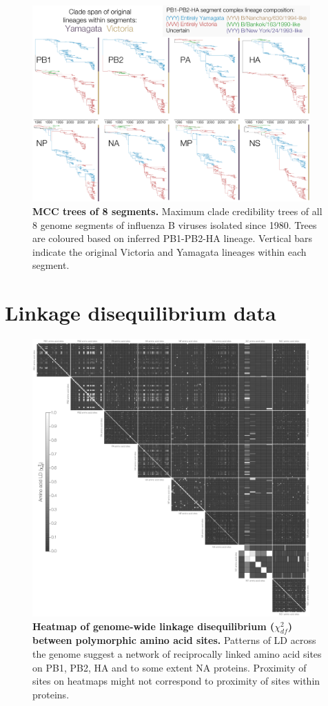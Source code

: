 \documentclass[11pt,oneside,letterpaper]{article}
\begin{document}
\begin{figure}
\centering  
\includegraphics[width=0.95\textwidth]  {supp_figures/InfB_genomeGrid.pdf}
\caption{\textbf{MCC trees of 8 segments.}
Maximum clade credibility trees of all 8 genome segments of influenza B viruses isolated since 1980.
Trees are coloured based on inferred PB1-PB2-HA lineage.
Vertical bars indicate the original Victoria and Yamagata lineages within each segment.}
\label{genomeGrid}
\end{figure}

\section*{Linkage disequilibrium data}

\begin{figure}
\centering  
\includegraphics[width=0.95\textwidth]  {supp_figures/aaChi_Genome.png}
\caption{\textbf{Heatmap of genome-wide linkage disequilibrium ($\chi^{2}_{df}$) between polymorphic amino acid sites.}
Patterns of LD across the genome suggest a network of reciprocally linked amino acid sites on PB1, PB2, HA and to some extent NA proteins.
Proximity of sites on heatmaps might not correspond to proximity of sites within proteins.}
\label{ChiGenome}
\end{figure}
\end{document}
